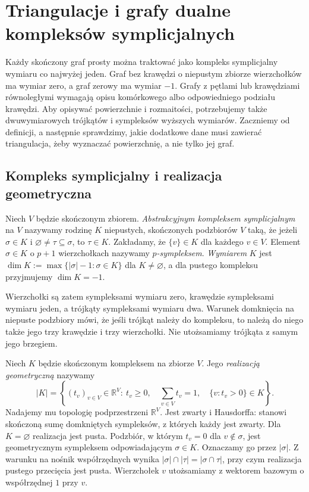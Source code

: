 \chapter{Triangulacje i grafy dualne kompleksów symplicjalnych}
\label{ch:tg-triangulacje}

Każdy skończony graf prosty można traktować jako kompleks
symplicjalny wymiaru co najwyżej jeden. Graf bez krawędzi
o niepustym zbiorze wierzchołków ma wymiar zero, a graf
zerowy ma wymiar $-1$. Grafy z pętlami lub krawędziami
równoległymi wymagają opisu komórkowego albo odpowiedniego
podziału krawędzi. Aby opisywać
powierzchnie i rozmaitości, potrzebujemy także dwuwymiarowych
trójkątów i sympleksów wyższych wymiarów. Zaczniemy od definicji,
a następnie sprawdzimy, jakie dodatkowe dane musi zawierać
triangulacja, żeby wyznaczać powierzchnię, a nie tylko jej graf.

\section{Kompleks symplicjalny i realizacja geometryczna}
\label{sec:tg-kompleks-symplicjalny}

\begin{definicja}
Niech $V$ będzie skończonym zbiorem. \emph{Abstrakcyjnym
kompleksem symplicjalnym} na $V$ nazywamy rodzinę $K$
niepustych, skończonych podzbiorów $V$ taką, że jeżeli
$\sigma\in K$ i $\varnothing\ne\tau\subseteq\sigma$,
to $\tau\in K$. Zakładamy, że $\{v\}\in K$ dla każdego $v\in V$. Element $\sigma\in K$
o $p+1$ wierzchołkach nazywamy \emph{$p$-sympleksem}.
\emph{Wymiarem} $K$ jest
$\dim K:=\max\{|\sigma|-1:\sigma\in K\}$ dla $K\ne\varnothing$,
a dla pustego kompleksu przyjmujemy $\dim K=-1$.
\end{definicja}

Wierzchołki są zatem sympleksami wymiaru zero, krawędzie
sympleksami wymiaru jeden, a trójkąty sympleksami wymiaru dwa.
Warunek domknięcia na niepuste podzbiory mówi, że jeśli
trójkąt należy do kompleksu, to należą do niego także jego
trzy krawędzie i trzy wierzchołki. Nie utożsamiamy
trójkąta z samym jego brzegiem.

\begin{definicja}
Niech $K$ będzie skończonym kompleksem na zbiorze $V$.
Jego \emph{realizacją geometryczną} nazywamy
\[
|K|=\left\{(t_v)_{v\in V}\in\mathbb R^V:\
t_v\ge0,\quad\sum_{v\in V}t_v=1,\quad
\{v:t_v>0\}\in K\right\}.
\]
Nadajemy mu topologię podprzestrzeni $\mathbb R^V$.
Jest zwarty i Hausdorffa: stanowi skończoną sumę
domkniętych sympleksów, z których każdy jest zwarty.
Dla $K=\varnothing$ realizacja jest pusta.
Podzbiór, w którym $t_v=0$ dla $v\notin\sigma$, jest
geometrycznym sympleksem odpowiadającym $\sigma\in K$.
Oznaczamy go przez $|\sigma|$. Z warunku na nośnik
współrzędnych wynika
$|\sigma|\cap|\tau|=|\sigma\cap\tau|$, przy czym realizacja
pustego przecięcia jest pusta. Wierzchołek $v$ utożsamiamy
z wektorem bazowym o współrzędnej $1$ przy $v$.
\end{definicja}

